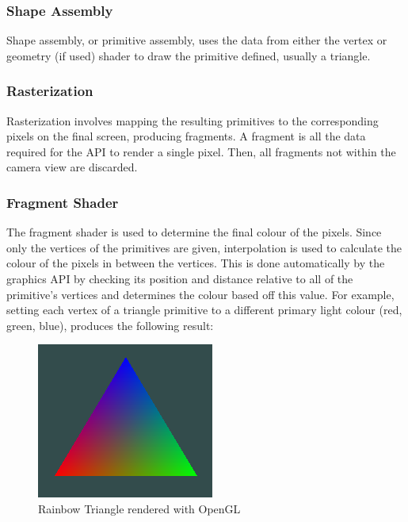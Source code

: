 \documentclass[12pt]{article}
\begin{document}
    \subsubsection{Shape Assembly}

    Shape assembly, or primitive assembly, uses the data from either the vertex or geometry (if used) shader to draw the primitive defined, usually a triangle.

    \subsubsection{Rasterization}

    Rasterization involves mapping the resulting primitives to the corresponding pixels on the final screen, producing fragments. A fragment is all the data required for the API to render a single pixel. Then, all fragments not within the camera view are discarded.

    \subsubsection{Fragment Shader}

    The fragment shader is used to determine the final colour of the pixels. Since only the vertices of the primitives are given, interpolation is used to calculate the colour of the pixels in between the vertices. This is done automatically by the graphics API by checking its position and distance relative to all of the primitive's vertices and determines the colour based off this value. For example, setting each vertex of a triangle primitive to a different primary light colour (red, green, blue), produces the following result:

    \begin{figure}[H]
        \begin{center}
            \includegraphics{rainbowTriangle.png}
            \caption{Rainbow Triangle rendered with OpenGL}
        \end{center}
    \end{figure}
\end{document}
